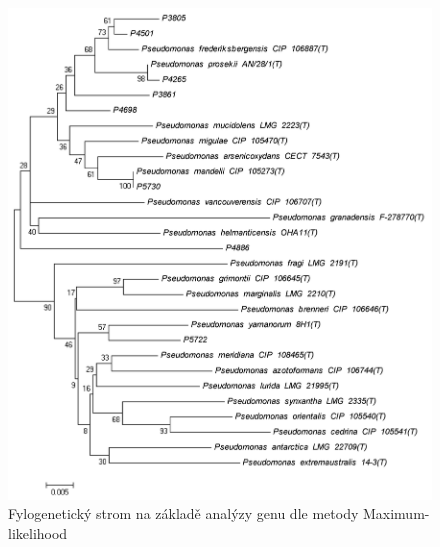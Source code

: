 \begin{figure}[h!!!]
  \centering
  \includegraphics[scale=0.50]{text/Pictures/160508_rpoB_multifasta_doplnek_ML_clustalW_Bootstrap-consensus.png}
	\caption{Fylogenetický strom na základě analýzy genu  dle metody Maximum-likelihood}
	\label{rpoB_ML}
\end{figure}
\pagebreak

